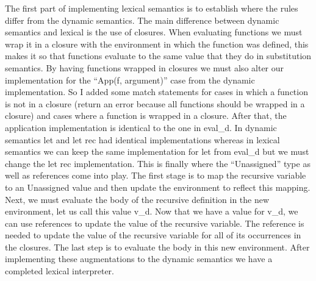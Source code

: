 \documentclass[12pt]{article}
\begin{document}
The first part of implementing lexical semantics is to establish where the rules differ from the dynamic semantics. The main difference between dynamic semantics and lexical is the use of closures. When evaluating functions we must wrap it in a closure with the environment in which the function was defined, this makes it so that functions evaluate to the same value that they do in substitution semantics. By having functions wrapped in closures we must also alter our implementation for the “App(f, argument)” case from the dynamic implementation. So I added some match statements for cases in which a function is not in a closure (return an error because all functions should be wrapped in a closure) and cases where a function is wrapped in a closure. After that, the application implementation is identical to the one in eval\_d. In dynamic semantics let and let rec had identical implementations whereas in lexical semantics we can keep the same implementation for let from eval\_d but we must change the let rec implementation. This is finally where the “Unassigned” type as well as references come into play. The first stage is to map the recursive variable to an Unassigned value and then update the environment to reflect this mapping. Next, we must evaluate the body of the recursive definition in the new environment, let us call this value v\_d. Now that we have a value for v\_d, we can use references to update the value of the recursive variable. The reference is needed to update the value of the recursive variable for all of its occurrences in the closures. The last step is to evaluate the body in this new environment. After implementing these augmentations to the dynamic semantics we have a completed lexical interpreter. 
\end{document}
